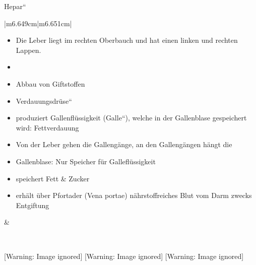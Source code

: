 \documentclass{article}
\begin{document}
{\quotedblbase}Hepar{\textquotedblleft}

\begin{center}
\tablehead{}\begin{supertabular}{|m{6.649cm}|m{6.651cm}|}
\hline
\begin{itemize}
\item Die Leber liegt im rechten Oberbauch und hat einen linken und
rechten Lappen. 

\item \item Abbau von Giftstoffen

\item {\quotedblbase}Verdauungsdr\"use{\textquotedblleft}

\end{itemize}
\begin{itemize}
\item produziert Gallenfl\"ussigkeit
({\quotedblbase}Galle{\textquotedblleft}), welche in der Gallenblase
gespeichert wird: Fettverdauung

\item Von der Leber gehen die Galleng\"ange, an den Galleng\"angen
h\"angt die 

\end{itemize}
\begin{itemize}
\item {}Gallenblase: Nur Speicher f\"ur
Gallefl\"ussigkeit

\end{itemize}
\begin{itemize}
\item speichert Fett \& Zucker

\item erh\"alt \"uber Pfortader (Vena portae)
n\"ahrstoffreiches Blut vom Darm zwecks Entgiftung

\end{itemize}
 &
 \par

\\\hline
\end{supertabular}
\end{center}
  [Warning: Image ignored] %
   [Warning: Image ignored] %
   [Warning: Image ignored] %
 
\end{document}
